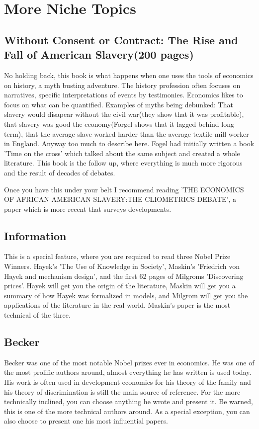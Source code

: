 \documentclass[12pt]{report}
\numberwithin{equation}{section}
\begin{document}
\section*{More Niche Topics}

\subsection*{Without Consent or Contract: The Rise and Fall of American Slavery(200 pages)}

No holding back, this book is what happens when one uses the tools of economics on history, a myth busting adventure. The history profession often focuses on narratives, specific interpretations of events by testimonies. Economics likes to focus on what can be quantified. Examples of myths being debunked: That slavery would disapear without the civil war(they show that it was profitable), that slavery was good the economy(Forgel shows that it lagged behind long term), that the average slave worked harder than the average textile mill worker in England. Anyway too much to describe here. Fogel had initially written a book 'Time on the cross' which talked about the same subject and created a whole literature. This book is the follow up, where everything is much more rigorous and the result of decades of debates. 

Once you have this under your belt I recommend reading 'THE ECONOMICS OF AFRICAN AMERICAN SLAVERY:THE CLIOMETRICS DEBATE', a paper which is more recent that surveys developments. 

\subsection*{Information}
This is a special feature, where you are required to read three Nobel Prize Winners. Hayek's 'The Use of Knowledge in Society', Maskin's 'Friedrich von Hayek and mechanism design', and the first 62 pages of Milgroms 'Discovering prices'. Hayek will get you the origin of the literature, Maskin will get you a summary of how Hayek was formalized in models, and Milgrom will get you the applications of the literature in the real world. Maskin's paper is the most technical of the three. 

\subsection*{Becker}

Becker was one of the most notable Nobel prizes ever in economics. He was one of the most prolific authors around, almost everything he has written is used today. His work is often used in development economics for his theory of the family and his theory of discrimination is still the main source of reference. For the more technically inclined, you can choose anything he wrote and present it. Be warned, this is one of the more technical authors around. As a special exception, you can also choose to present one his most influential papers. 
\end{document}
